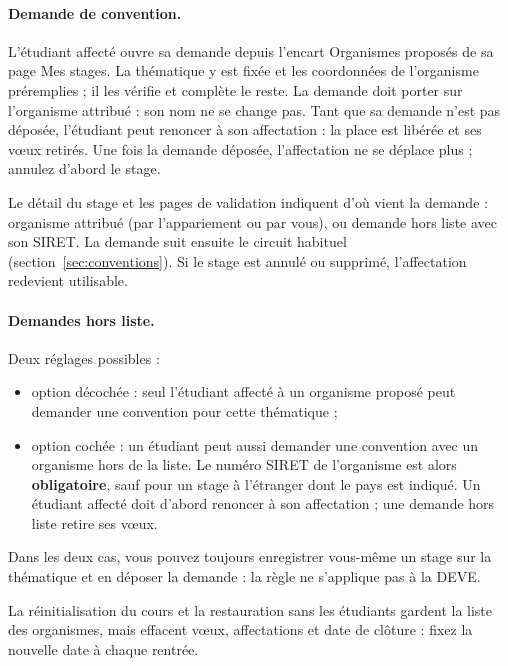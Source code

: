 \documentclass[11pt,a4paper]{article}
\begin{document}
\paragraph{Demande de convention.} L'étudiant affecté ouvre sa demande depuis
l'encart \og Organismes proposés\fg{} de sa page \og Mes stages\fg{}. La
thématique y est fixée et les coordonnées de l'organisme préremplies ; il les
vérifie et complète le reste. La demande doit porter sur l'organisme attribué :
son nom ne se change pas. Tant que sa demande n'est pas déposée, l'étudiant peut
renoncer à son affectation : la place est libérée et ses vœux retirés. Une fois
la demande déposée, l'affectation ne se déplace plus ; annulez d'abord le stage.

Le détail du stage et les pages de validation indiquent d'où vient la demande :
organisme attribué (par l'appariement ou par vous), ou demande hors liste avec
son SIRET. La demande suit ensuite le circuit habituel
(section~\ref{sec:conventions}). Si le stage est annulé ou supprimé,
l'affectation redevient utilisable.

\paragraph{Demandes hors liste.} Deux réglages possibles :

\begin{itemize}
  \item option décochée : seul l'étudiant affecté à un organisme proposé peut
        demander une convention pour cette thématique ;
  \item option cochée : un étudiant peut aussi demander une convention avec un
        organisme hors de la liste. Le numéro SIRET de l'organisme est alors
        \textbf{obligatoire}, sauf pour un stage à l'étranger dont le pays est
        indiqué. Un étudiant affecté doit d'abord renoncer à son affectation ;
        une demande hors liste retire ses vœux.
\end{itemize}

Dans les deux cas, vous pouvez toujours enregistrer vous-même un stage sur la
thématique et en déposer la demande : la règle ne s'applique pas à la DEVE.

\begin{attention}
La réinitialisation du cours et la restauration sans les étudiants gardent la
liste des organismes, mais effacent vœux, affectations et date de clôture :
fixez la nouvelle date à chaque rentrée.
\end{attention}
\end{document}
